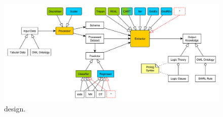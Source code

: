 \documentclass[
]{ceurart}
\begin{document}
%

\subsection{\psyke}\label{ssec:psyke}

\begin{figure}
\centering
	\includegraphics[width=.9\linewidth]{figures/Psyke.pdf}
	\caption{\psyke{} design.}
	\label{fig:psyke-design}
\end{figure}


\end{document}
